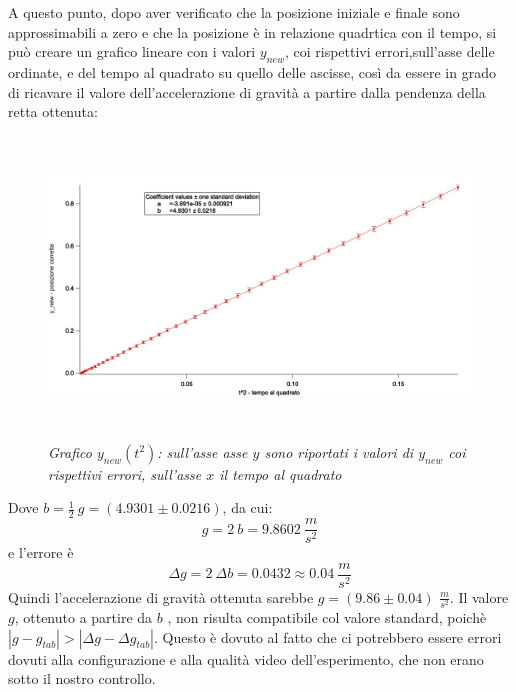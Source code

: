 \documentclass[12pt, a4paper]{article}
\begin{document}
A questo punto, dopo aver verificato che la posizione iniziale e finale sono approssimabili a zero e che la posizione è in relazione quadrtica con il tempo, si può creare un grafico lineare con i valori $y_{new}$, coi rispettivi errori,sull'asse delle ordinate, e del tempo al quadrato su quello delle ascisse, così da essere in grado di ricavare il valore dell'accelerazione di gravità a partire dalla pendenza della retta ottenuta:
  \begin{figure}[h!]
\centering
\includegraphics[width=170mm, height=80mm]{Immagini/Graph5 non comp.jpg}
\caption{\textit{{\footnotesize{Grafico $y_{new}(t^2)$: sull'asse asse $y$ sono riportati i valori di $y_{new}$ coi rispettivi errori, sull'asse $x$ il tempo al quadrato}}}}
\label{Grafico logaritmico}
\end{figure}


\newpage


Dove $\displaystyle b=\frac{1}{2}\ g=(4.9301\pm 0.0216)$, da cui:
\begin{equation*}
    g=2 \ b=9.8602 \ \frac{m}{s^2}
\end{equation*}
e l'errore è
\begin{equation*}
    \Delta g=2\ \Delta b=0.0432\approx 0.04 \ \frac{m}{s^2}
\end{equation*}
Quindi l'accelerazione di gravità ottenuta sarebbe $g=(9.86\pm0.04)$ $\frac{m}{s^2}$.
Il valore $g$, ottenuto a partire da $b$ , non risulta compatibile col valore standard, poichè $|g-g_{tab}|> |\Delta g-\Delta g_{tab}|$. Questo è dovuto al fatto che ci potrebbero essere errori dovuti alla configurazione e alla qualità video dell'esperimento, che non erano sotto il nostro controllo.
\end{document}
